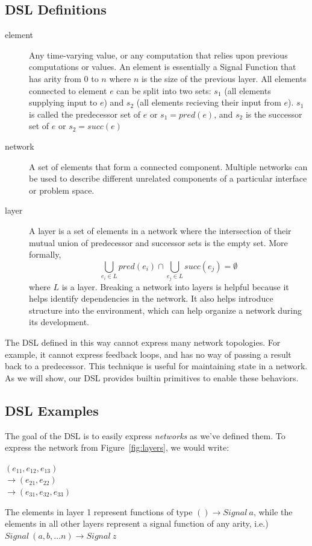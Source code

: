 \documentclass[twocolumn,11pt,english]{article}
\begin{document}
\subsection{DSL Definitions}
\begin{description}

\item[element] Any time-varying value, or any computation that relies upon previous computations or values. An element is essentially a Signal Function that has arity from 0 to $n$ where $n$ is the size of the previous layer. All elements connected to element $e$ can be split into two sets: $s_1$ (all elements supplying input to $e$) and $s_2$ (all elements recieving their input from $e$). $s_1$ is called the predecessor set of $e$ or $s_1 = pred(e)$, and $s_2$ is the successor set of $e$ or $s_2 = succ(e)$

\item[network] A set of elements that form a connected component. Multiple networks can be used to describe different unrelated components of a particular interface or problem space.

\item[layer] A layer is a set of elements in a network where the intersection of their mutual union of predecessor and successor sets is the empty set. More formally,
\begin{equation}
  \bigcup_{e_i \in L}{pred(e_i)} \cap \bigcup_{e_j \in L}{succ(e_j)} = \emptyset
\end{equation}
where $L$ is a layer. Breaking a network into layers is helpful because it helps identify dependencies in the network. It also helps introduce structure into the environment, which can help organize a network during its development. 

\end{description}

The DSL defined in this way cannot express many network topologies. For example, it cannot express feedback loops, and has no way of passing a result back to a predecessor. This technique is useful for maintaining state in a network. As we will show, our DSL provides builtin primitives to enable these behaviors. 

\subsection{DSL Examples}
The goal of the DSL is to easily express \textit{networks} as we've defined them. To express the network from Figure~\ref{fig:layers}, we would write:
\begin{center}
$(e_{11}, e_{12}, e_{13})$
\\ $\rightarrow (e_{21}, e_{22})$
\\ $\rightarrow (e_{31}, e_{32}, e_{33})$
\end{center}
The elements in layer 1 represent functions of type $() \rightarrow Signal~a$, while the elements in all other layers represent a signal function of any arity, i.e.) $Signal~(a, b, ... n) \rightarrow Signal~z$
\end{document}
